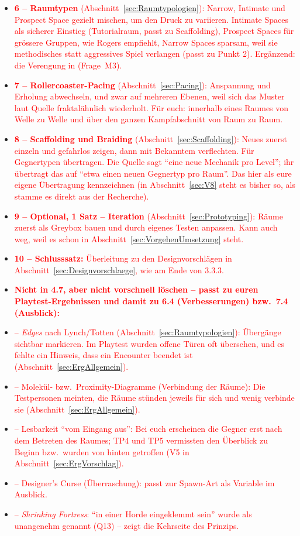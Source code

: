 \documentclass[../Main.tex]{subfiles}
\begin{document}
\begin{itemize}[leftmargin=1.5cm]
    \item \textcolor{red}{\textbf{6 -- Raumtypen} (Abschnitt~\ref{sec:Raumtypologien}): Narrow, Intimate und Prospect Space gezielt mischen, um den Druck zu variieren. Intimate Spaces als sicherer Einstieg (Tutorialraum, passt zu Scaffolding), Prospect Spaces für grössere Gruppen, wie Rogers empfiehlt, Narrow Spaces sparsam, weil sie methodisches statt aggressives Spiel verlangen (passt zu Punkt 2). Ergänzend: die Verengung in  (Frage~M3).}
    \item \textcolor{red}{\textbf{7 -- Rollercoaster-Pacing} (Abschnitt~\ref{sec:Pacing}): Anspannung und Erholung abwechseln, und zwar auf mehreren Ebenen, weil sich das Muster laut Quelle fraktalähnlich wiederholt. Für euch: innerhalb eines Raumes von Welle zu Welle und über den ganzen Kampfabschnitt von Raum zu Raum.}
    \item \textcolor{red}{\textbf{8 -- Scaffolding und Braiding} (Abschnitt~\ref{sec:Scaffolding}): Neues zuerst einzeln und gefahrlos zeigen, dann mit Bekanntem verflechten. Für Gegnertypen übertragen. Die Quelle sagt \enquote{eine neue Mechanik pro Level}; ihr übertragt das auf \enquote{etwa einen neuen Gegnertyp pro Raum}. Das hier als eure eigene Übertragung kennzeichnen (in Abschnitt~\ref{sec:V8} steht es bisher so, als stamme es direkt aus der Recherche).}
    \item \textcolor{red}{\textbf{9 -- Optional, 1 Satz -- Iteration} (Abschnitt~\ref{sec:Prototyping}): Räume zuerst als Greybox bauen und durch eigenes Testen anpassen. Kann auch weg, weil es schon in Abschnitt~\ref{sec:VorgehenUmsetzung} steht.}
    \item \textcolor{red}{\textbf{10 -- Schlusssatz:} Überleitung zu den Designvorschlägen in Abschnitt~\ref{sec:Designvorschlaege}, wie am Ende von 3.3.3.}
    \item \textcolor{red}{\textbf{Nicht in 4.7, aber nicht vorschnell löschen -- passt zu euren Playtest-Ergebnissen und damit zu 6.4 (Verbesserungen) bzw.\ 7.4 (Ausblick):}}
    \item \textcolor{red}{-- \textit{Edges} nach Lynch/Totten (Abschnitt~\ref{sec:Raumtypologien}): Übergänge sichtbar markieren. Im Playtest wurden offene Türen oft übersehen, und es fehlte ein Hinweis, dass ein Encounter beendet ist (Abschnitt~\ref{sec:ErgAllgemein}).}
    \item \textcolor{red}{-- Molekül- bzw.\ Proximity-Diagramme (Verbindung der Räume): Die Testpersonen meinten, die Räume stünden jeweils für sich und wenig verbinde sie (Abschnitt~\ref{sec:ErgAllgemein}).}
    \item \textcolor{red}{-- Lesbarkeit \enquote{vom Eingang aus}: Bei euch erscheinen die Gegner erst nach dem Betreten des Raumes; TP4 und TP5 vermissten den Überblick zu Beginn bzw.\ wurden von hinten getroffen (V5 in Abschnitt~\ref{sec:ErgVorschlag}).}
    \item \textcolor{red}{-- Designer's Curse (Überraschung): passt zur Spawn-Art als Variable im Ausblick.}
    \item \textcolor{red}{-- \textit{Shrinking Fortress}: \enquote{in einer Horde eingeklemmt sein} wurde als unangenehm genannt (Q13) -- zeigt die Kehrseite des Prinzips.}
\end{itemize}
\end{document}
